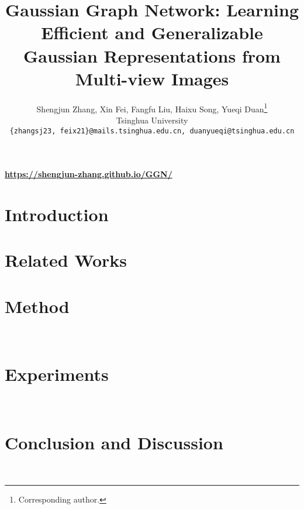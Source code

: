 \documentclass{article}
\title{Gaussian Graph Network: Learning Efficient and Generalizable Gaussian Representations from Multi-view Images}
\author{%
  Shengjun Zhang, Xin Fei, Fangfu Liu, Haixu Song, Yueqi Duan\thanks{Corresponding author.} \\
  Tsinghua University \\
  \texttt{\{zhangsj23, feix21\}@mails.tsinghua.edu.cn, duanyueqi@tsinghua.edu.cn} \\
}
\begin{document}
\maketitle


\begin{center}
\textbf{\url{https://shengjun-zhang.github.io/GGN/}}
\end{center}

\begin{abstract}

\end{abstract}


\section{Introduction}


\section{Related Works}


\section{Method}~\label{sec:methods}


\section{Experiments}~\label{sec:experiments}


\section{Conclusion and Discussion}~\label{sec:conclusion and discussion}

\end{document}
